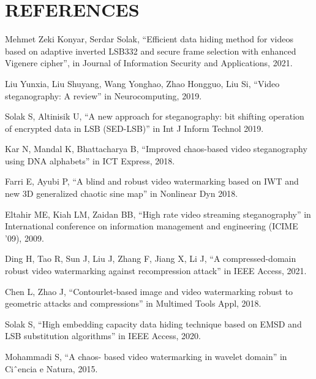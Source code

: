 \chapter{
    \textbf{REFERENCES}
}
\begin{enumerate}[{[1].}]
    \item Mehmet Zeki Konyar, Serdar Solak, “Efficient data hiding method for videos based on adaptive inverted LSB332 and secure frame selection with enhanced Vigenere cipher”, in Journal of Information Security and Applications, 2021.
    \item Liu Yunxia, Liu Shuyang, Wang Yonghao, Zhao Hongguo, Liu Si, “Video steganography: A review” in Neurocomputing, 2019.
    \item Solak S, Altinisik U, “A new approach for steganography: bit shifting operation of encrypted data in LSB (SED-LSB)” in Int J Inform Technol 2019.
    \item Kar N, Mandal K, Bhattacharya B, “Improved chaos-based video steganography using DNA alphabets” in ICT Express, 2018.
    \item Farri E, Ayubi P, “A blind and robust video watermarking based on IWT and new 3D generalized chaotic sine map” in Nonlinear Dyn 2018.
    \item Eltahir ME, Kiah LM, Zaidan BB, “High rate video streaming steganography” in International conference on information management and engineering (ICIME ’09), 2009.
    \item Ding H, Tao R, Sun J, Liu J, Zhang F, Jiang X, Li J, “A compressed-domain robust video watermarking against recompression attack” in IEEE Access, 2021.
    \item Chen L, Zhao J, “Contourlet-based image and video watermarking robust to geometric attacks and compressions” in Multimed Tools Appl, 2018.
    \item Solak S, “High embedding capacity data hiding technique based on EMSD and LSB substitution algorithms” in IEEE Access, 2020.
    \item Mohammadi S, “A chaos- based video watermarking in wavelet domain” in Ciˆencia e Natura, 2015.
\end{enumerate}
